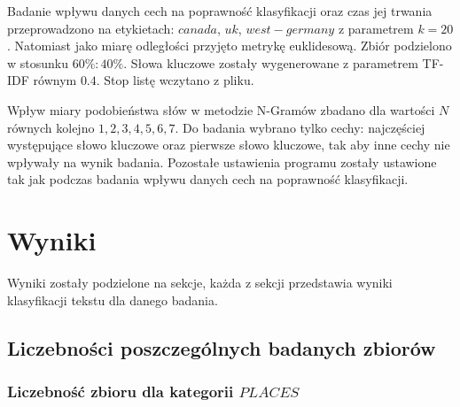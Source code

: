 \documentclass{classrep}
\begin{document}
Badanie wpływu danych cech na poprawność klasyfikacji oraz czas jej trwania przeprowadzono na
etykietach: $canada$, $uk$, $west-germany$ z parametrem $k=20$. Natomiast jako miarę odległości
przyjęto metrykę euklidesową. Zbiór podzielono w stosunku $60\%:40\%$. Słowa kluczowe zostały wygenerowane
z parametrem TF-IDF równym $0.4$. Stop listę wczytano z pliku.

Wpływ miary podobieństwa słów w metodzie N-Gramów zbadano dla wartości $N$ równych kolejno ${1,2,3,4,5,6,7}$.
Do badania wybrano tylko cechy: najczęściej występujące słowo kluczowe oraz pierwsze słowo kluczowe, tak
aby inne cechy nie wpływały na wynik badania. Pozostałe ustawienia programu zostały ustawione tak jak podczas badania wpływu danych cech na
poprawność klasyfikacji.





\section{Wyniki}
Wyniki zostały podzielone na sekcje, każda z sekcji przedstawia wyniki klasyfikacji tekstu
dla danego badania.
\subsection{Liczebności poszczególnych badanych zbiorów}
\subsubsection{Liczebność zbioru dla kategorii $PLACES$}
\end{document}
